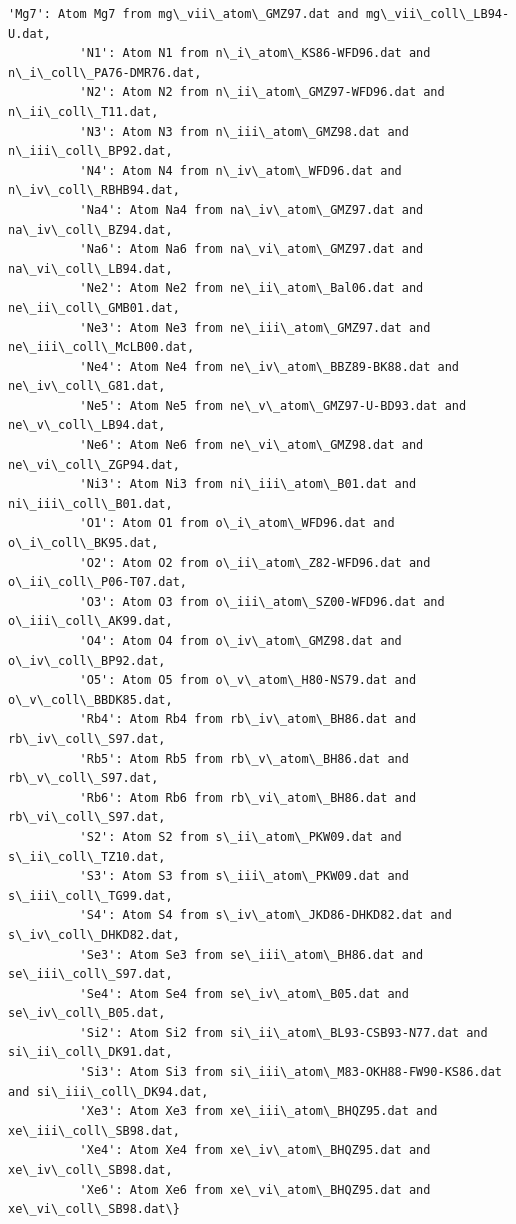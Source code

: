 \documentclass[11pt]{article}
\begin{document}
\begin{Verbatim}[commandchars=\\\{\}]
          'Mg7': Atom Mg7 from mg\_vii\_atom\_GMZ97.dat and mg\_vii\_coll\_LB94-U.dat,
          'N1': Atom N1 from n\_i\_atom\_KS86-WFD96.dat and n\_i\_coll\_PA76-DMR76.dat,
          'N2': Atom N2 from n\_ii\_atom\_GMZ97-WFD96.dat and n\_ii\_coll\_T11.dat,
          'N3': Atom N3 from n\_iii\_atom\_GMZ98.dat and n\_iii\_coll\_BP92.dat,
          'N4': Atom N4 from n\_iv\_atom\_WFD96.dat and n\_iv\_coll\_RBHB94.dat,
          'Na4': Atom Na4 from na\_iv\_atom\_GMZ97.dat and na\_iv\_coll\_BZ94.dat,
          'Na6': Atom Na6 from na\_vi\_atom\_GMZ97.dat and na\_vi\_coll\_LB94.dat,
          'Ne2': Atom Ne2 from ne\_ii\_atom\_Bal06.dat and ne\_ii\_coll\_GMB01.dat,
          'Ne3': Atom Ne3 from ne\_iii\_atom\_GMZ97.dat and ne\_iii\_coll\_McLB00.dat,
          'Ne4': Atom Ne4 from ne\_iv\_atom\_BBZ89-BK88.dat and ne\_iv\_coll\_G81.dat,
          'Ne5': Atom Ne5 from ne\_v\_atom\_GMZ97-U-BD93.dat and ne\_v\_coll\_LB94.dat,
          'Ne6': Atom Ne6 from ne\_vi\_atom\_GMZ98.dat and ne\_vi\_coll\_ZGP94.dat,
          'Ni3': Atom Ni3 from ni\_iii\_atom\_B01.dat and ni\_iii\_coll\_B01.dat,
          'O1': Atom O1 from o\_i\_atom\_WFD96.dat and o\_i\_coll\_BK95.dat,
          'O2': Atom O2 from o\_ii\_atom\_Z82-WFD96.dat and o\_ii\_coll\_P06-T07.dat,
          'O3': Atom O3 from o\_iii\_atom\_SZ00-WFD96.dat and o\_iii\_coll\_AK99.dat,
          'O4': Atom O4 from o\_iv\_atom\_GMZ98.dat and o\_iv\_coll\_BP92.dat,
          'O5': Atom O5 from o\_v\_atom\_H80-NS79.dat and o\_v\_coll\_BBDK85.dat,
          'Rb4': Atom Rb4 from rb\_iv\_atom\_BH86.dat and rb\_iv\_coll\_S97.dat,
          'Rb5': Atom Rb5 from rb\_v\_atom\_BH86.dat and rb\_v\_coll\_S97.dat,
          'Rb6': Atom Rb6 from rb\_vi\_atom\_BH86.dat and rb\_vi\_coll\_S97.dat,
          'S2': Atom S2 from s\_ii\_atom\_PKW09.dat and s\_ii\_coll\_TZ10.dat,
          'S3': Atom S3 from s\_iii\_atom\_PKW09.dat and s\_iii\_coll\_TG99.dat,
          'S4': Atom S4 from s\_iv\_atom\_JKD86-DHKD82.dat and s\_iv\_coll\_DHKD82.dat,
          'Se3': Atom Se3 from se\_iii\_atom\_BH86.dat and se\_iii\_coll\_S97.dat,
          'Se4': Atom Se4 from se\_iv\_atom\_B05.dat and se\_iv\_coll\_B05.dat,
          'Si2': Atom Si2 from si\_ii\_atom\_BL93-CSB93-N77.dat and si\_ii\_coll\_DK91.dat,
          'Si3': Atom Si3 from si\_iii\_atom\_M83-OKH88-FW90-KS86.dat and si\_iii\_coll\_DK94.dat,
          'Xe3': Atom Xe3 from xe\_iii\_atom\_BHQZ95.dat and xe\_iii\_coll\_SB98.dat,
          'Xe4': Atom Xe4 from xe\_iv\_atom\_BHQZ95.dat and xe\_iv\_coll\_SB98.dat,
          'Xe6': Atom Xe6 from xe\_vi\_atom\_BHQZ95.dat and xe\_vi\_coll\_SB98.dat\}
\end{Verbatim}
        
\end{document}

